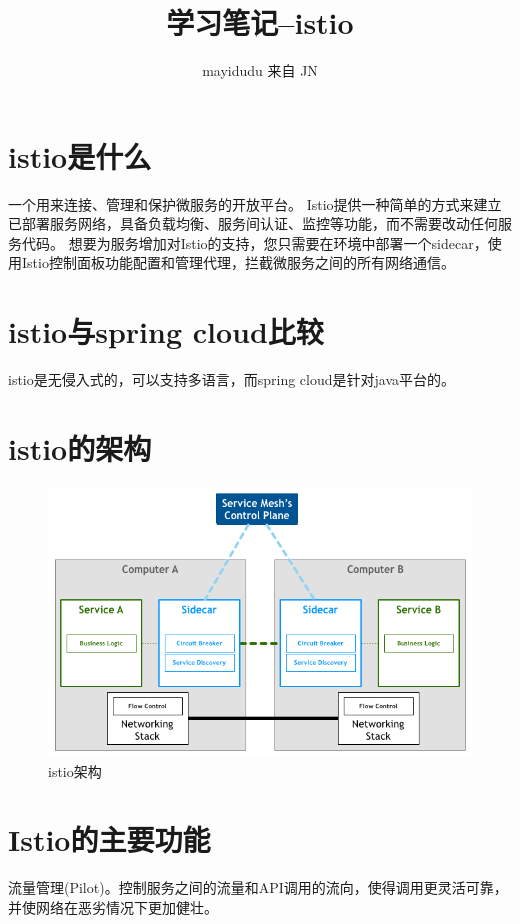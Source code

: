\documentclass{ctexart}
\newcommand{\jn}{JN}
\begin{document}
\title{学习笔记--istio}
\author{mayidudu 来自 \jn}
\maketitle



\section{istio是什么}
一个用来连接、管理和保护微服务的开放平台。 
Istio提供一种简单的方式来建立已部署服务网络，具备负载均衡、服务间认证、监控等功能，而不需要改动任何服务代码。 
想要为服务增加对Istio的支持，您只需要在环境中部署一个sidecar，使用Istio控制面板功能配置和管理代理，拦截微服务之间的所有网络通信。
\section{istio与spring cloud比较}
istio是无侵入式的，可以支持多语言，而spring cloud是针对java平台的。

\section{istio的架构}
\begin{figure}[H]
\includegraphics[scale=0.6]{istio/framework.png}
\caption{istio架构}
\end{figure}

\section{Istio的主要功能}
流量管理(Pilot)。控制服务之间的流量和API调用的流向，使得调用更灵活可靠，并使网络在恶劣情况下更加健壮。
\end{document}

